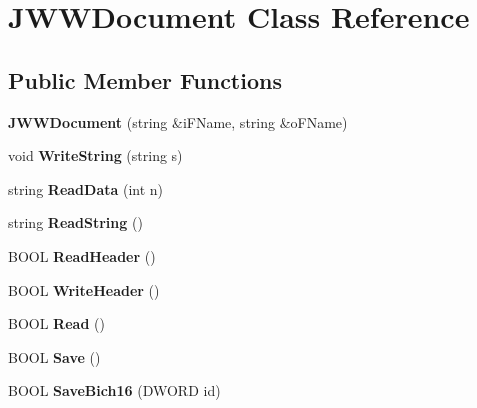 \hypertarget{classJWWDocument}{\section{J\-W\-W\-Document Class Reference}
\label{classJWWDocument}
}
\subsection*{Public Member Functions}
\begin{DoxyCompactItemize}
\item 
\hypertarget{classJWWDocument_ae013041d3488d18032fd8985319225b0}{{\bfseries J\-W\-W\-Document} (string \&i\-F\-Name, string \&o\-F\-Name)}\label{classJWWDocument_ae013041d3488d18032fd8985319225b0}

\item 
\hypertarget{classJWWDocument_a4387b5d8e6427b1ffb32139da993e81a}{void {\bfseries Write\-String} (string s)}\label{classJWWDocument_a4387b5d8e6427b1ffb32139da993e81a}

\item 
\hypertarget{classJWWDocument_af66f73454f7503e6485fcce92ebb6f5a}{string {\bfseries Read\-Data} (int n)}\label{classJWWDocument_af66f73454f7503e6485fcce92ebb6f5a}

\item 
\hypertarget{classJWWDocument_ae963e4f590387671e72da9a7efc50d75}{string {\bfseries Read\-String} ()}\label{classJWWDocument_ae963e4f590387671e72da9a7efc50d75}

\item 
\hypertarget{classJWWDocument_aa54dd4bd484810b95a851f749e1bdd05}{B\-O\-O\-L {\bfseries Read\-Header} ()}\label{classJWWDocument_aa54dd4bd484810b95a851f749e1bdd05}

\item 
\hypertarget{classJWWDocument_a2960521557e8739e9aabaa3ae3d32382}{B\-O\-O\-L {\bfseries Write\-Header} ()}\label{classJWWDocument_a2960521557e8739e9aabaa3ae3d32382}

\item 
\hypertarget{classJWWDocument_a99949e286bd8f4ee7686f1cade1831de}{B\-O\-O\-L {\bfseries Read} ()}\label{classJWWDocument_a99949e286bd8f4ee7686f1cade1831de}

\item 
\hypertarget{classJWWDocument_a3d43620a2362fdfb97ce803300c9b426}{B\-O\-O\-L {\bfseries Save} ()}\label{classJWWDocument_a3d43620a2362fdfb97ce803300c9b426}

\item 
\hypertarget{classJWWDocument_a15402f80f8f0e99e9a48668901c6322b}{B\-O\-O\-L {\bfseries Save\-Bich16} (D\-W\-O\-R\-D id)}\label{classJWWDocument_a15402f80f8f0e99e9a48668901c6322b}


\end{DoxyCompactItemize}
